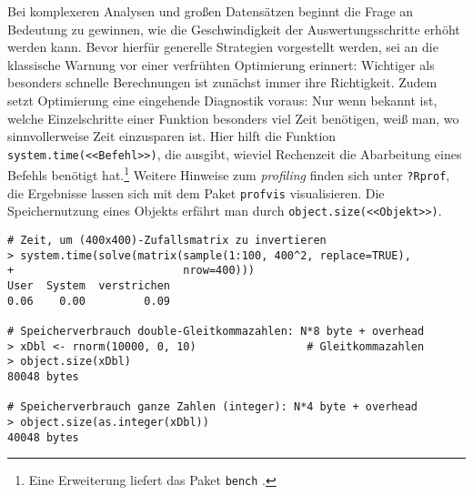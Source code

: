 Bei komplexeren Analysen und großen Datensätzen beginnt die Frage an Bedeutung zu gewinnen, wie die Geschwindigkeit der Auswertungsschritte erhöht werden kann. Bevor hierfür generelle Strategien vorgestellt werden, sei an die klassische Warnung vor einer verfrühten Optimierung erinnert: Wichtiger als besonders schnelle Berechnungen ist zunächst immer ihre Richtigkeit. Zudem setzt Optimierung eine eingehende Diagnostik voraus: Nur wenn bekannt ist, welche Einzelschritte einer Funktion besonders viel Zeit benötigen, weiß man, wo sinnvollerweise Zeit einzusparen ist. Hier hilft die Funktion \lstinline!system.time(<<Befehl>>)!, die ausgibt, wieviel Rechenzeit die Abarbeitung eines Befehls benötigt hat.\footnote{Eine Erweiterung liefert das Paket  \lstinline!bench! \cite{Hester2019b}.} Weitere Hinweise zum \emph{profiling} finden sich unter \lstinline!?Rprof!, die Ergebnisse lassen sich mit dem Paket  \lstinline!profvis! \cite{Chang2016} visualisieren. Die Speichernutzung eines Objekts erfährt man durch \lstinline!object.size(<<Objekt>>)!.
\begin{lstlisting}
# Zeit, um (400x400)-Zufallsmatrix zu invertieren
> system.time(solve(matrix(sample(1:100, 400^2, replace=TRUE),
+                          nrow=400)))
User  System  verstrichen
0.06    0.00         0.09

# Speicherverbrauch double-Gleitkommazahlen: N*8 byte + overhead
> xDbl <- rnorm(10000, 0, 10)                 # Gleitkommazahlen
> object.size(xDbl)
80048 bytes

# Speicherverbrauch ganze Zahlen (integer): N*4 byte + overhead
> object.size(as.integer(xDbl))
40048 bytes
\end{lstlisting}

